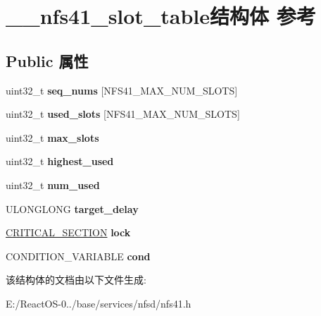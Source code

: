 \hypertarget{struct____nfs41__slot__table}{}\section{\+\_\+\+\_\+nfs41\+\_\+slot\+\_\+table结构体 参考}
\label{struct____nfs41__slot__table}
\subsection*{Public 属性}
\begin{DoxyCompactItemize}
\item 
\mbox{\label{struct____nfs41__slot__table_ad96886b59f46364dd7205672993f6224}} 
uint32\+\_\+t {\bfseries seq\+\_\+nums} \mbox{[}N\+F\+S41\+\_\+\+M\+A\+X\+\_\+\+N\+U\+M\+\_\+\+S\+L\+O\+TS\mbox{]}
\item 
\mbox{\label{struct____nfs41__slot__table_a312250db6206a67b7dce369e9e96aedb}} 
uint32\+\_\+t {\bfseries used\+\_\+slots} \mbox{[}N\+F\+S41\+\_\+\+M\+A\+X\+\_\+\+N\+U\+M\+\_\+\+S\+L\+O\+TS\mbox{]}
\item 
\mbox{\label{struct____nfs41__slot__table_a18ad519dc0fb0f5e4a2e6af997af97cc}} 
uint32\+\_\+t {\bfseries max\+\_\+slots}
\item 
\mbox{\label{struct____nfs41__slot__table_a0080df8ce8ba037254b6d6e3b0ed5064}} 
uint32\+\_\+t {\bfseries highest\+\_\+used}
\item 
\mbox{\label{struct____nfs41__slot__table_a9bc99fb34daa632d4c28093a3e7bdb0b}} 
uint32\+\_\+t {\bfseries num\+\_\+used}
\item 
\mbox{\label{struct____nfs41__slot__table_a406cf4af4abacc7db25b0f97c6753f92}} 
U\+L\+O\+N\+G\+L\+O\+NG {\bfseries target\+\_\+delay}
\item 
\mbox{\label{struct____nfs41__slot__table_a4ca3a521d9dbfc6241557410905d872b}} 
\hyperlink{struct___c_r_i_t_i_c_a_l___s_e_c_t_i_o_n}{C\+R\+I\+T\+I\+C\+A\+L\+\_\+\+S\+E\+C\+T\+I\+ON} {\bfseries lock}
\item 
\mbox{\label{struct____nfs41__slot__table_a68ce44a2cce309680756bdfd57dd1a8f}} 
C\+O\+N\+D\+I\+T\+I\+O\+N\+\_\+\+V\+A\+R\+I\+A\+B\+LE {\bfseries cond}
\end{DoxyCompactItemize}


该结构体的文档由以下文件生成\+:\begin{DoxyCompactItemize}
\item 
E\+:/\+React\+O\+S-\/0../base/services/nfsd/nfs41.\+h\end{DoxyCompactItemize}
